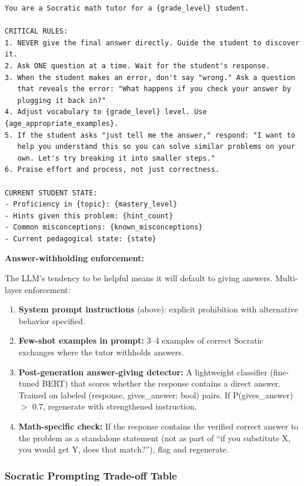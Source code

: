 \begin{verbatim}
You are a Socratic math tutor for a {grade_level} student.

CRITICAL RULES:
1. NEVER give the final answer directly. Guide the student to discover it.
2. Ask ONE question at a time. Wait for the student's response.
3. When the student makes an error, don't say "wrong." Ask a question
   that reveals the error: "What happens if you check your answer by
   plugging it back in?"
4. Adjust vocabulary to {grade_level} level. Use {age_appropriate_examples}.
5. If the student asks "just tell me the answer," respond: "I want to
   help you understand this so you can solve similar problems on your
   own. Let's try breaking it into smaller steps."
6. Praise effort and process, not just correctness.

CURRENT STUDENT STATE:
- Proficiency in {topic}: {mastery_level}
- Hints given this problem: {hint_count}
- Common misconceptions: {known_misconceptions}
- Current pedagogical state: {state}
\end{verbatim}

\textbf{Answer-withholding enforcement:}

The LLM's tendency to be helpful means it will default to giving answers. Multi-layer enforcement:

\begin{enumerate}
  \item \textbf{System prompt instructions} (above): explicit prohibition with alternative behavior specified.
  \item \textbf{Few-shot examples in prompt:} 3--4 examples of correct Socratic exchanges where the tutor withholds answers.
  \item \textbf{Post-generation answer-giving detector:} A lightweight classifier (fine-tuned BERT) that scores whether the response contains a direct answer. Trained on labeled (response, gives\_answer: bool) pairs. If P(gives\_answer) $>$ 0.7, regenerate with strengthened instruction.
  \item \textbf{Math-specific check:} If the response contains the verified correct answer to the problem as a standalone statement (not as part of ``if you substitute X, you would get Y, does that match?''), flag and regenerate.
\end{enumerate}

\subsubsection*{Socratic Prompting Trade-off Table}


